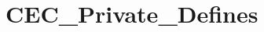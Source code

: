 \hypertarget{group___c_e_c___private___defines}{\section{C\-E\-C\-\_\-\-Private\-\_\-\-Defines}
\label{group___c_e_c___private___defines}
}
